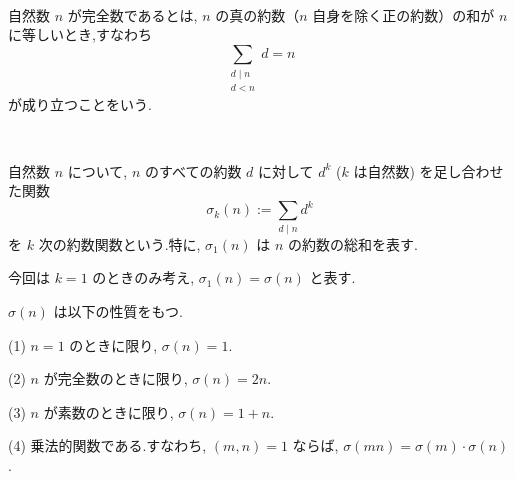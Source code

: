 %

\begin{definition}[完全数]\label{perfect}\leanok~\

自然数 \(n\) が完全数であるとは, \(n\) の真の約数（\(n\) 自身を除く正の約数）の和が \(n\) に等しいとき,すなわち
\[
\sum_{\substack{d \mid n\\ d < n}} d = n
\]
\;\;\;が成り立つことをいう.

\end{definition}


\begin{definition}[約数関数]\label{Arithmetic_Function}\leanok~\

自然数 \(n\) について, \(n\) のすべての約数 \(d\) に対して \(d^k\) (\(k\) は自然数) を足し合わせた関数
\[
\sigma_k(n) := \sum_{d \mid n} d^k
\]
\;\;\;を \(k\) 次の約数関数という.特に, \(\sigma_1(n)\) は \(n\) の約数の総和を表す.

\end{definition}

\vspace{0.5\baselineskip}

今回は \(k = 1\) のときのみ考え, \(\sigma_1(n) = \sigma(n)\) と表す.

\begin{lemma}

\(\sigma(n)\) は以下の性質をもつ.

\vspace{0.5\baselineskip}

(1) \(n = 1\) のときに限り, \(\sigma(n) = 1\).

(2) \(n\) が完全数のときに限り, \(\sigma(n) = 2n\).

(3) \(n\) が素数のときに限り, \(\sigma(n) =  1 + n\).

(4) 乗法的関数である.すなわち, \((m, n) = 1\) ならば, \(\sigma(mn) = \sigma(m) \cdot \sigma(n)\).


\end{lemma}


